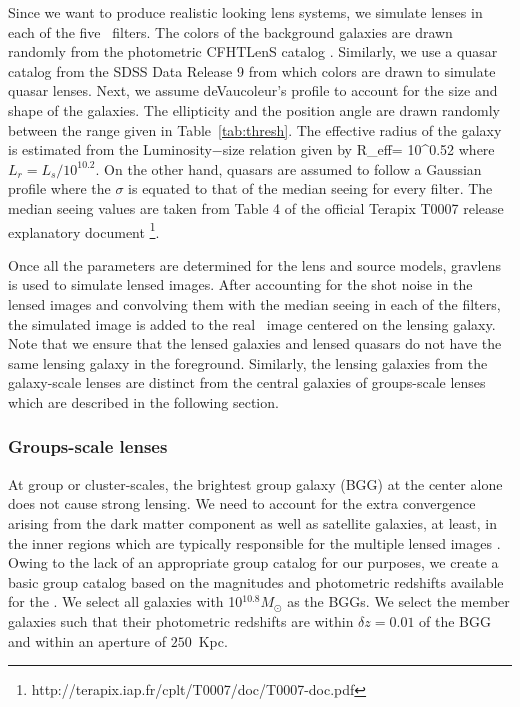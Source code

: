 \documentclass[useAMS,usenatbib,a4paper]{mn2e}
\begin{document}
Since we want to produce realistic looking lens systems, we simulate lenses in
each of the five \cfhtls~filters. The colors of the background galaxies are drawn
randomly from the photometric CFHTLenS catalog
\citep{Hildebrandt2012,Erben2013}.  Similarly, we use a quasar catalog from the
SDSS Data Release 9 \citep{Paris2012} from which colors are drawn to simulate
quasar lenses. Next, we assume deVaucoleur's profile to account for the size
and shape of the galaxies. The ellipticity and the position angle are drawn
randomly between the range given in Table~\ref{tab:thresh}. The effective
radius of the galaxy is estimated from the Luminosity$-$size relation
\citep{Bernardi2003} given by 
\be
R_{\rm eff}= 10^{0.52} 
\ee
where $L_r=L_s/10^{10.2}$. On the other hand, quasars are assumed to follow a
Gaussian profile where the $\sigma$ is equated to that of the median seeing for
every filter. The median seeing values are taken from Table 4 of the official
Terapix T0007 release explanatory document \footnote{
    http://terapix.iap.fr/cplt/T0007/doc/T0007-doc.pdf}.  

Once all the parameters are determined for the lens and source models, {\sc
gravlens} is used to simulate lensed images.  After accounting for the shot
noise in the lensed images and convolving them with the median seeing in each of
the filters, the simulated image is added to the real \cfhtls~image centered
on the lensing galaxy. Note that we ensure that the lensed galaxies and
lensed quasars do not have the same lensing galaxy in the foreground. Similarly,
the lensing galaxies from the galaxy-scale lenses are distinct from the central
galaxies of groups-scale lenses which are described in the following section.


\subsubsection{Groups-scale lenses} 

At group or cluster-scales, the brightest group galaxy (BGG) at the center alone
does not cause strong lensing. We need to account for the extra convergence
arising from the dark matter component as well as satellite galaxies, at least,
in the inner regions which are typically responsible for the multiple lensed
images \citep{Oguri2005,Oguri2006}. Owing to the lack of an appropriate group
catalog for our purposes, we create a basic group catalog based on the
magnitudes and photometric redshifts available for the \cfhtls. We select all
galaxies with 10$^{10.8} M_\odot$ as the BGGs. We select the member galaxies
such that their photometric redshifts are within $\delta z = 0.01$ of the BGG
and within an aperture of $250$~Kpc. 
\end{document}
